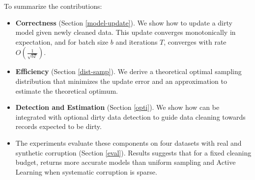 \noindent To summarize the contributions:
\begin{itemize}[noitemsep]
\item \textbf{Correctness} (Section \ref{model-update}). We show how to update a dirty model given newly cleaned data. This update converges monotonically in expectation, and for batch size $b$ and iterations $T$, converges with rate $O(\frac{1}{\sqrt{bT}})$. 
\item \textbf{Efficiency} (Section \ref{dist-samp}). We derive a theoretical optimal sampling distribution that minimizes the update error and an approximation to estimate the theoretical optimum.
\item \textbf{Detection and Estimation} (Section \ref{opti}). We show how \sys can be integrated with optional dirty data detection to guide data cleaning towards records expected to be dirty.
\item The experiments evaluate these components on four datasets with real and synthetic corruption (Section \ref{eval}). Results suggests that for a fixed cleaning budget, \sys returns more accurate models than uniform sampling and Active Learning when systematic corruption is sparse.

\end{itemize}






